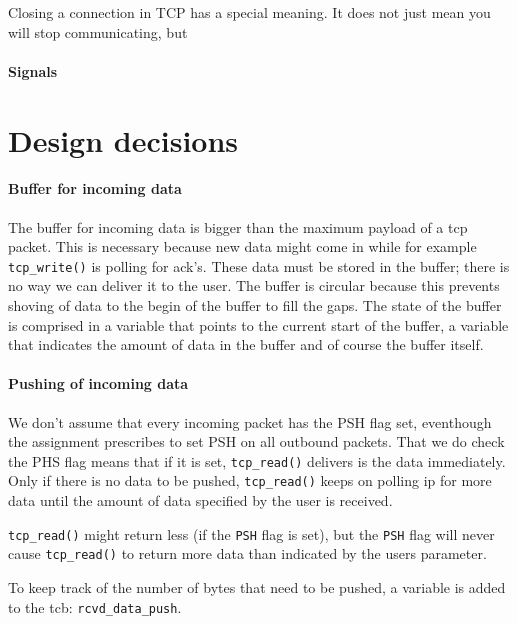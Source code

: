 \documentclass[11pt]{article}
\begin{document}
Closing a connection in TCP has a special meaning. It does not just mean you
will stop communicating, but 

\paragraph{Signals}




\section{Design decisions}


\paragraph{Buffer for incoming data}
    The buffer for incoming data is bigger than the maximum payload of a tcp
    packet. This is necessary because new data might come in while for example 
    \lstinline|tcp_write()| is polling for ack's. These data must be stored in the 
    buffer; 
    there is no way we can deliver it to the user.
    The buffer is circular because this prevents shoving of data to the begin of 
    the buffer to fill the gaps. 
    The state of the buffer is comprised in a variable that points to the 
    current start of the buffer, a variable that indicates the amount of data in 
    the buffer and of course the buffer itself.    

\paragraph{Pushing of incoming data}
    We don't assume that every incoming packet has the PSH flag set, eventhough 
    the assignment prescribes to set PSH on all outbound packets. That we do
    check the PHS flag means 
    that if it is set, \lstinline|tcp_read()| delivers is the data immediately.
    Only if there is no data to be pushed, \lstinline|tcp_read()| keeps on polling 
    ip for 
    more data until the amount of data specified by the user is received.
    
    \lstinline|tcp_read()| might return less (if the \lstinline|PSH| flag is set), but 
    the \lstinline|PSH| flag 
    will never cause \lstinline|tcp_read()| to return more 
    data than indicated by the users parameter.
    
    To keep track of the number of bytes that need to be pushed, a variable is 
    added to the tcb: \lstinline|rcvd_data_push|.
\end{document}
